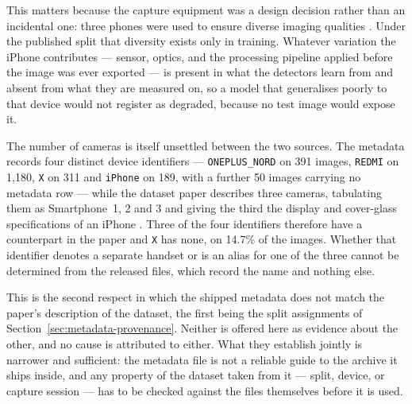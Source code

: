 This matters because the capture equipment was a design decision rather than an
incidental one: three phones were used to ensure diverse imaging qualities
\citep{electrocom61}. Under the published split that diversity exists only in
training. Whatever variation the iPhone contributes --- sensor, optics, and the
processing pipeline applied before the image was ever exported --- is present in
what the detectors learn from and absent from what they are measured on, so a
model that generalises poorly to that device would not register as degraded,
because no test image would expose it.

The number of cameras is itself unsettled between the two sources. The metadata
records four distinct device identifiers --- \texttt{ONEPLUS\_NORD} on 391
images, \texttt{REDMI} on 1{,}180, \texttt{X} on 311 and \texttt{iPhone} on 189,
with a further 50 images carrying no metadata row --- while the dataset paper
describes three cameras, tabulating them as Smartphone~1, 2 and 3 and giving the
third the display and cover-glass specifications of an iPhone
\citep{electrocom61}. Three of the four identifiers therefore have a counterpart
in the paper and \texttt{X} has none, on 14.7\% of the images. Whether that
identifier denotes a separate handset or is an alias for one of the three cannot
be determined from the released files, which record the name and nothing else.

This is the second respect in which the shipped metadata does not match the
paper's description of the dataset, the first being the split assignments of
Section~\ref{sec:metadata-provenance}. Neither is offered here as evidence about
the other, and no cause is attributed to either. What they establish jointly is
narrower and sufficient: the metadata file is not a reliable guide to the archive
it ships inside, and any property of the dataset taken from it --- split, device,
or capture session --- has to be checked against the files themselves before it
is used.

